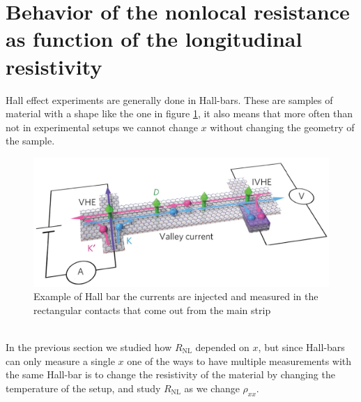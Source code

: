 


\section{Behavior of the nonlocal resistance as function of the longitudinal resistivity}
Hall effect experiments are generally done in Hall-bars. These are samples of material with a shape like the one in figure \ref{fig:hall-bar}, it also means that more often than not in experimental setups we cannot change $x$ without changing the geometry of the sample.
\begin{figure}[h!]
    \centering
    \includegraphics[width=\linewidth]{Immagini/rnl/hallbarbrutta.png}
    \caption{Example of Hall bar the currents are injected and measured in the rectangular contacts that come out from the main strip}
    \label{fig:hall-bar}
\end{figure}\\
In the previous section we studied how $R_{\textrm{NL}}$ depended on $x$, but since Hall-bars can only measure a single $x$ one of the ways to have multiple measurements with the same Hall-bar is to change the resistivity of the material by changing the temperature of the setup, and study $R_{\textrm{NL}}$ as we change $\rho_{xx}$.


